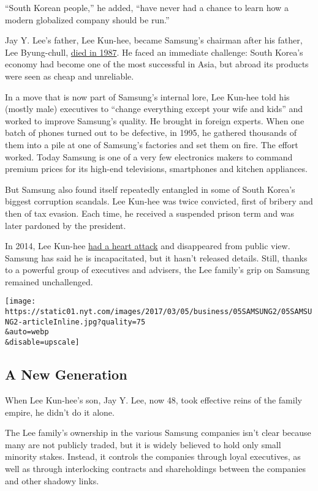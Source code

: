 ``South Korean people,'' he added, ``have never had a chance to learn
how a modern globalized company should be run.''

Jay Y. Lee's father, Lee Kun-hee, became Samsung's chairman after his
father, Lee Byung-chull,
\href{http://www.nytimes.com/1987/11/20/obituaries/lee-byung-chull-77-industrialist-of-korea.html}{died
in 1987}. He faced an immediate challenge: South Korea's economy had
become one of the most successful in Asia, but abroad its products were
seen as cheap and unreliable.

In a move that is now part of Samsung's internal lore, Lee Kun-hee told
his (mostly male) executives to ``change everything except your wife and
kids'' and worked to improve Samsung's quality. He brought in foreign
experts. When one batch of phones turned out to be defective, in 1995,
he gathered thousands of them into a pile at one of Samsung's factories
and set them on fire. The effort worked. Today Samsung is one of a very
few electronics makers to command premium prices for its high-end
televisions, smartphones and kitchen appliances.

But Samsung also found itself repeatedly entangled in some of South
Korea's biggest corruption scandals. Lee Kun-hee was twice convicted,
first of bribery and then of tax evasion. Each time, he received a
suspended prison term and was later pardoned by the president.

In 2014, Lee Kun-hee
\href{https://www.nytimes.com/2014/05/12/business/international/samsungs-chairman-has-surgery-after-heart-attack.html}{had
a heart attack} and disappeared from public view. Samsung has said he is
incapacitated, but it hasn't released details. Still, thanks to a
powerful group of executives and advisers, the Lee family's grip on
Samsung remained unchallenged.

\texttt{[image: https://static01.nyt.com/images/2017/03/05/business/05SAMSUNG2/05SAMSUNG2-articleInline.jpg?quality=75\\\&auto=webp\\\&disable=upscale]}

\hypertarget{a-new-generation}{%
\subsection{A New Generation}\label{a-new-generation}}

When Lee Kun-hee's son, Jay Y. Lee, now 48, took effective reins of the
family empire, he didn't do it alone.

The Lee family's ownership in the various Samsung companies isn't clear
because many are not publicly traded, but it is widely believed to hold
only small minority stakes. Instead, it controls the companies through
loyal executives, as well as through interlocking contracts and
shareholdings between the companies and other shadowy links.

